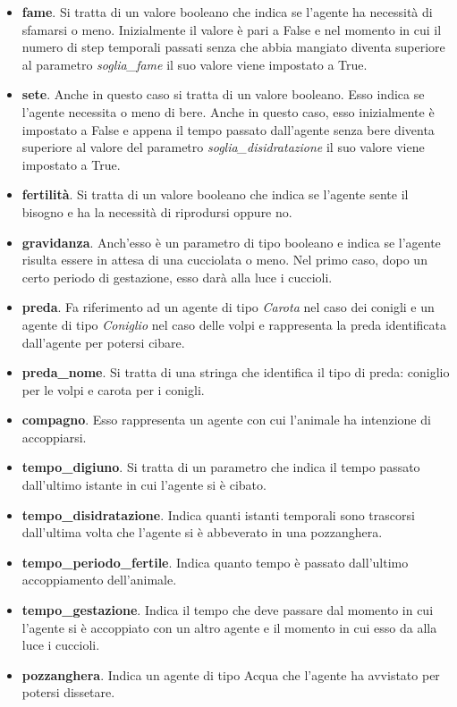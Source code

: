 \documentclass[11pt]{article}
\begin{document}
\begin{itemize}
    \item \textbf{fame}. Si tratta di un valore booleano che indica se l'agente ha necessità di sfamarsi o meno. Inizialmente il valore è pari a False e nel momento in cui il numero di step temporali passati senza che abbia mangiato diventa superiore al parametro \emph{soglia\_fame} il suo valore viene impostato a True. 
    \item \textbf{sete}. Anche in questo caso si tratta di un valore booleano. Esso indica se l'agente necessita o meno di bere. Anche in questo caso, esso inizialmente è impostato a False e appena il tempo passato dall'agente senza bere diventa superiore al valore del parametro \emph{soglia\_disidratazione} il suo valore viene impostato a True. 
    \item \textbf{fertilità}. Si tratta di un valore booleano che indica se l'agente sente il bisogno e ha la necessità di riprodursi oppure no. 
    \item \textbf{gravidanza}. Anch'esso è un parametro di tipo booleano e indica se l'agente risulta essere in attesa di una cucciolata o meno. Nel primo caso, dopo un certo periodo di gestazione, esso darà alla luce i cuccioli. 
    \item \textbf{preda}. Fa riferimento ad un agente di tipo \emph{Carota} nel caso dei conigli e un agente di tipo \emph{Coniglio} nel caso delle volpi e rappresenta la preda identificata dall'agente per potersi cibare. 
    \item \textbf{preda\_nome}. Si tratta di una stringa che identifica il tipo di preda: coniglio per le volpi e carota per i conigli. 
    \item \textbf{compagno}. Esso rappresenta un agente con cui l'animale ha intenzione di accoppiarsi. 
    \item \textbf{tempo\_digiuno}. Si tratta di un parametro che indica il tempo passato dall'ultimo istante in cui l'agente si è cibato.
    \item \textbf{tempo\_disidratazione}. Indica quanti istanti temporali sono trascorsi dall'ultima volta che l'agente si è abbeverato in una pozzanghera. 
    \item \textbf{tempo\_periodo\_fertile}. Indica quanto tempo è passato dall'ultimo accoppiamento dell'animale. 
    \item \textbf{tempo\_gestazione}. Indica il tempo che deve passare dal momento in cui l'agente si è accoppiato con un altro agente e il momento in cui esso da alla luce i cuccioli. 
    \item \textbf{pozzanghera}. Indica un agente di tipo Acqua che l'agente ha avvistato per potersi dissetare.

\end{itemize}
\end{document}
